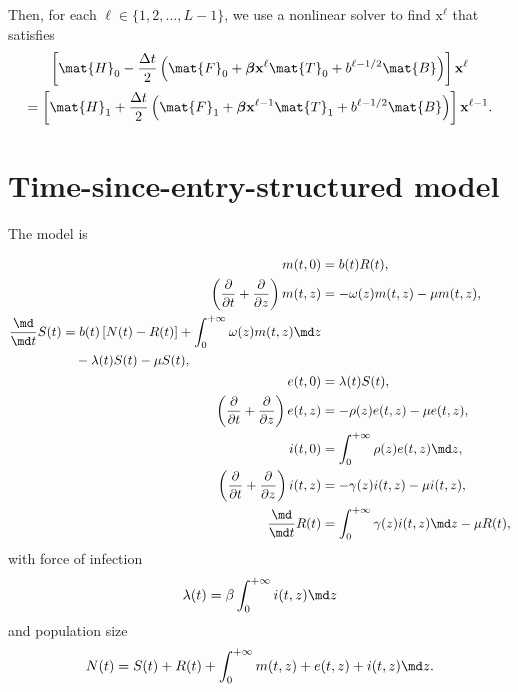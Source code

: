 \documentclass{jpmarticle}
\renewcommand{\vec}[1]{\boldsymbol{\mathrm{#1}}}
\let\subequationsorig\subequations%
\let\endsubequationsorig\endsubequations%
\renewenvironment{subequations}{
  \subequationsorig
  \renewcommand{\theequation}{\theparentequation.\arabic{equation}}
}{
  \endsubequationsorig
}
\begin{document}
Then, for each $\ell \in \{1, 2, \ldots, L - 1\}$,
we use a nonlinear solver to find $\vec{x}^{\ell}$ that satisfies
\begin{multline}
  \left[
    \mat{H}_0
    - \frac{\Delta t}{2}
    \left(
      \mat{F}_0
      + \vec{\beta} \vec{x}^{\ell} \mat{T}_0
      + b^{\ell - 1 / 2} \mat{B}
    \right)
  \right] \vec{x}^{\ell}
  \\
  = \left[
    \mat{H}_1
    + \frac{\Delta t}{2}
    \left(
      \mat{F}_1
      + \vec{\beta} \vec{x}^{\ell - 1} \mat{T}_1
      + b^{\ell - 1 / 2} \mat{B}
    \right)
  \right] \vec{x}^{\ell - 1}.
\end{multline}


\section{Time-since-entry-structured model}

The model is
\begin{subequations}
  \label{model_time_since_entry_structured}
  \begin{align}
    m(t, 0) &=
    b(t) R(t),
    \\
    \left(\frac{\partial}{\partial t}
      + \frac{\partial}{\partial z}\right)
    m(t, z) &=
    - \omega(z) m(t, z) - \mu m(t, z),
    \\
    \begin{split}
      \frac{\md}{\md t} S(t) &=
      b(t) \left[N(t) - R(t)\right]
      + \int_0^{+\infty} \omega(z) m(t, z) \md z
      \\ & \quad {}
      - \lambda(t) S(t) - \mu S(t),
    \end{split}
    \\
    e(t, 0) &=
    \lambda(t) S(t),
    \\
    \left(\frac{\partial}{\partial t}
      + \frac{\partial}{\partial z}\right)
    e(t, z) &=
    - \rho(z) e(t, z) - \mu e(t, z),
    \\
    i(t, 0) &=
    \int_0^{+\infty} \rho(z) e(t, z) \md z,
    \\
    \left(\frac{\partial}{\partial t}
      + \frac{\partial}{\partial z}\right)
    i(t, z) &=
    - \gamma(z) i(t, z) - \mu i(t, z),
    \\
    \frac{\md}{\md t} R(t) &=
    \int_0^{+\infty} \gamma(z) i(t, z) \md z
    - \mu R(t),
  \end{align}
  with force of infection
  \begin{equation}
    \lambda(t) = \beta \int_0^{+\infty} i(t, z) \md z
  \end{equation}
  and population size
  \begin{equation}
    N(t) =
    S(t) + R(t)
    + \int_0^{+\infty} m(t, z) + e(t, z) + i(t, z) \md z.
  \end{equation}
\end{subequations}
\end{document}
